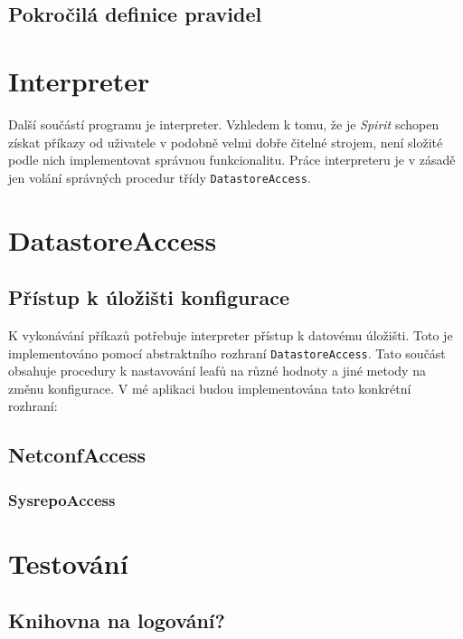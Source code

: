 \documentclass[thesis=B,czech,hidelinks]{FITthesis}[2019/03/06]
\begin{document}
\subsection{Pokročilá definice pravidel}\label{advanced-rules}


\section{Interpreter}
Další součástí programu je interpreter. Vzhledem k tomu, že je \textit{Spirit} schopen získat příkazy od uživatele v podobně velmi dobře čitelné strojem, není složité podle nich implementovat správnou funkcionalitu. Práce interpreteru je v zásadě jen volání správných procedur třídy \texttt{DatastoreAccess}.

\section{DatastoreAccess}
\subsection{Přístup k úložišti konfigurace}
K vykonávání příkazů potřebuje interpreter přístup k datovému úložišti. Toto je implementováno pomocí abstraktního rozhraní \texttt{DatastoreAccess}. Tato součást obsahuje procedury k nastavování leafů na různé hodnoty a jiné metody na změnu konfigurace. V mé aplikaci budou implementována tato konkrétní rozhraní:

\subsection{NetconfAccess}

\subsubsection{SysrepoAccess}

\section{Testování}

\subsection{Knihovna na logování?}
\end{document}
